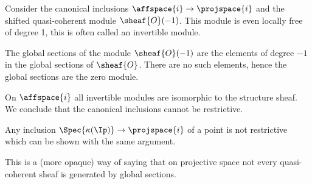 \begin{example}
Consider the canonical inclusions $\affspace{i} \rightarrow \projspace{i}$
and the shifted quasi-coherent module $\sheaf{O}(-1)$.
This module is even locally free of degree 1, this is often called an invertible module.

The global sections of the module $\sheaf{O}(-1)$ are the elements of degree $-1$
in the global sections of $\sheaf{O}$. There are no such elements, hence the global sections are the zero module.

On $\affspace{i}$ all invertible modules are isomorphic to the structure sheaf. %
We conclude that the canonical inclusions cannot be restrictive.

Any inclusion $\Spec{\kappa(\Ip)} \rightarrow \projspace{i}$ of a point is not restrictive which can be shown with the same argument.

This is a (more opaque) way of saying that on projective space 
not every quasi-coherent sheaf is generated by global sections. 
\end{example}
